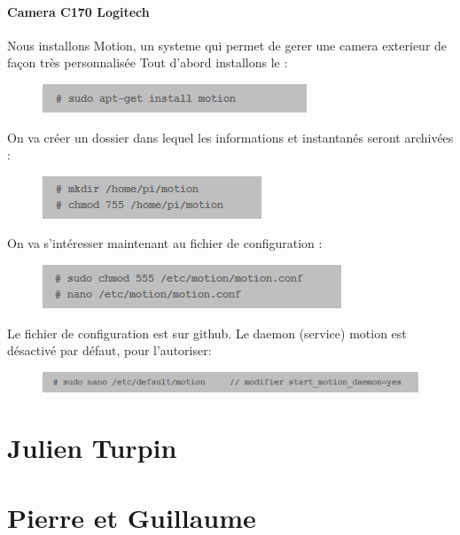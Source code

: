 \documentclass[a4paper,11pt]{report}
\begin{document}
			\subsubsection{Camera C170 Logitech}
			
			Nous installons Motion, un systeme qui permet de gerer une camera exterieur de façon très personnalisée \newline Tout d'abord installons le :
			\begin{figure}[!h]
				\begin{center}
					\includegraphics{Illustrations/14.png}
				\end{center}
			\end{figure}
			\newline On va créer un dossier dans lequel les informations et instantanés seront archivées :
			\begin{figure}[!h]
				\begin{center}
					\includegraphics{Illustrations/15.png}
				\end{center}
			\end{figure}
			\newline On va s’intéresser maintenant au fichier de configuration :
			\begin{figure}[!h]
				\begin{center}
					\includegraphics{Illustrations/16.png}
				\end{center}
			\end{figure}
			\newline Le fichier de configuration est sur github.
			\newline Le daemon (service) motion est désactivé par défaut, pour l'autoriser:
			\begin{figure}[!h]
				\begin{center}
					\includegraphics{Illustrations/17.png}
				\end{center}
			\end{figure}
			
			\chapter{Julien Turpin}

\chapter{Pierre et Guillaume}
\end{document}
